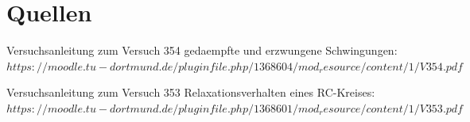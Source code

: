 \documentclass[titlepage=firstcover, captions=tableheading]{scrartcl}
\begin{document}
\section{Quellen}

Versuchsanleitung zum Versuch 354 gedaempfte und erzwungene Schwingungen: \\
$https://moodle.tu-dortmund.de/pluginfile.php/1368604/mod_resource/content/1/V354.pdf$

\noindent Versuchsanleitung zum Versuch 353 Relaxationsverhalten eines RC-Kreises:\\
$https://moodle.tu-dortmund.de/pluginfile.php/1368601/mod_resource/content/1/V353.pdf$
\end{document}
